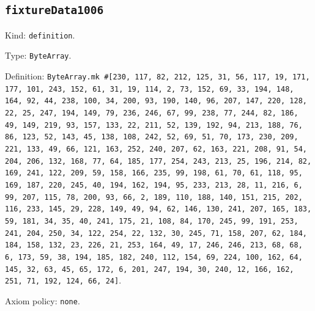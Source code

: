 \documentclass[11pt]{article}
\begin{document}
\subsection*{\texttt{fixtureData1006}}
\noindent Kind: \texttt{definition}.\par
\noindent Type: \texttt{ByteArray}.\par
\noindent Definition: \texttt{ByteArray.mk \#[230, 117, 82, 212, 125, 31, 56, 117, 19, 171, 177, 101, 243, 152, 61, 31, 19, 114, 2, 73, 152, 69, 33, 194, 148, 164, 92, 44, 238, 100, 34, 200, 93, 190, 140, 96, 207, 147, 220, 128, 22, 25, 247, 194, 149, 79, 236, 246, 67, 99, 238, 77, 244, 82, 186, 49, 149, 219, 93, 157, 133, 22, 211, 52, 139, 192, 94, 213, 188, 76, 86, 123, 52, 143, 45, 138, 108, 242, 52, 69, 51, 70, 173, 230, 209, 221, 133, 49, 66, 121, 163, 252, 240, 207, 62, 163, 221, 208, 91, 54, 204, 206, 132, 168, 77, 64, 185, 177, 254, 243, 213, 25, 196, 214, 82, 169, 241, 122, 209, 59, 158, 166, 235, 99, 198, 61, 70, 61, 118, 95, 169, 187, 220, 245, 40, 194, 162, 194, 95, 233, 213, 28, 11, 216, 6, 99, 207, 115, 78, 200, 93, 66, 2, 189, 110, 188, 140, 151, 215, 202, 116, 233, 145, 29, 228, 149, 49, 94, 62, 146, 130, 241, 207, 165, 183, 59, 181, 34, 35, 40, 241, 175, 21, 108, 84, 170, 245, 99, 191, 253, 241, 204, 250, 34, 122, 254, 22, 132, 30, 245, 71, 158, 207, 62, 184, 184, 158, 132, 23, 226, 21, 253, 164, 49, 17, 246, 246, 213, 68, 68, 6, 173, 59, 38, 194, 185, 182, 240, 112, 154, 69, 224, 100, 162, 64, 145, 32, 63, 45, 65, 172, 6, 201, 247, 194, 30, 240, 12, 166, 162, 251, 71, 192, 124, 66, 24]}.\par
\noindent Axiom policy: \texttt{none}.\par
\end{document}
